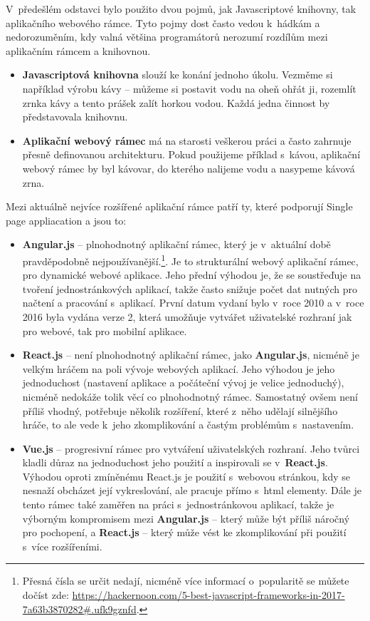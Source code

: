 \par V~předešlém odstavci bylo použito dvou pojmů, jak Javascriptové knihovny, tak aplikačního webového rámce. Tyto pojmy dost často vedou k~hádkám a nedorozuměním, kdy valná většina programátorů nerozumí rozdílům mezi aplikačním rámcem a knihovnou.
\begin{itemize}
\item \textbf{Javascriptová knihovna} slouží ke konání jednoho úkolu. Vezměme si například výrobu kávy -- můžeme si postavit vodu na oheň ohřát ji, rozemlít zrnka kávy a tento prášek zalít horkou vodou. Každá jedna činnost by představovala knihovnu. \cite{framework-vs-library}
\item \textbf{Aplikační webový rámec} má na starosti veškerou práci a často zahrnuje přesně definovanou architekturu. Pokud použijeme příklad s~kávou, aplikační webový rámec by byl kávovar, do kterého nalijeme vodu a nasypeme kávová zrna. \cite{framework-vs-library}
\end{itemize}

\par Mezi aktuálně nejvíce rozšířené aplikační rámce patří ty, které podporují Single page appliacation a jsou to:
\begin{itemize}
\item \textbf{Angular.js} -- plnohodnotný aplikační rámec, který je v~aktuální době pravděpodobně nejpoužívanější.\footnote{Přesná čísla se určit nedají, nicméně více informací o~popularitě se můžete dočíst zde: \url{https://hackernoon.com/5-best-javascript-frameworks-in-2017-7a63b3870282\#.ufk9gznfd}.}. Je to strukturální webový aplikační rámec, pro dynamické webové aplikace. Jeho přední výhodou je, že se soustřeďuje na tvoření jednostránkových aplikací, takže často snižuje počet dat nutných pro načtení a pracování s~aplikací. První datum vydaní bylo v~roce 2010 a v~roce 2016 byla vydána verze 2, která umožňuje vytvářet uživatelské rozhraní jak pro webové, tak pro mobilní aplikace.
\item \textbf{React.js} -- není plnohodnotný aplikační rámec, jako \textbf{Angular.js}, nicméně je velkým hráčem na poli vývoje webových aplikací. Jeho výhodou je jeho jednoduchost (nastavení aplikace a počáteční vývoj je velice jednoduchý), nicméně nedokáže tolik věcí co plnohodnotný rámec. Samostatný ovšem není příliš vhodný, potřebuje několik rozšíření, které z~něho udělají silnějšího hráče, to ale vede k~jeho zkomplikování  a častým problémům s~nastavením.
\item \textbf{Vue.js} -- progresivní rámec pro vytváření uživatelských rozhraní. Jeho tvůrci kladli důraz na jednoduchost jeho použití a inspirovali se v~\textbf{React.js}. Výhodou oproti zmíněnému React.js je použití s~webovou stránkou, kdy se nesnaží obcházet její vykreslování, ale pracuje přímo s~html elementy. Dále je tento rámec také zaměřen na práci s~jednostránkovou aplikací, takže je výborným kompromisem mezi \textbf{Angular.js} -- který může být příliš náročný pro pochopení, a \textbf{React.js} -- který může vést ke zkomplikování při použití s~více rozšířeními.
\end{itemize}


